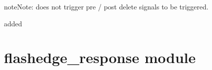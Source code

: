 \documentclass[letterpaper,10pt,english]{sphinxmanual}
\begin{document}
\begin{fulllineitems}
\begin{fulllineitems}
\begin{sphinxVerbatim}[commandchars=\\\{\}]
 
      
      

  
\end{sphinxVerbatim}

\begin{sphinxadmonition}{note}{Note:}
 does not trigger pre / post delete signals to be
triggered.
\end{sphinxadmonition}

added 

\end{fulllineitems}


\end{fulllineitems}



\chapter{flashedge\_response module}
\label{\detokenize{flashedge_response:flashedge-response-module}}\label{\detokenize{flashedge_response::doc}}\label{\detokenize{flashedge_response:module-flashedge_response}}
\end{document}
